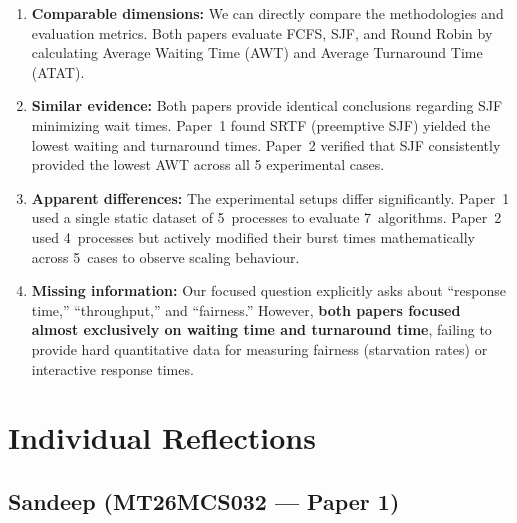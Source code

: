 \documentclass[11pt, a4paper]{article}
\begin{document}
\begin{enumerate}[nosep]
    \item \textbf{Comparable dimensions:} We can directly compare the methodologies and evaluation metrics. Both papers evaluate FCFS, SJF, and Round Robin by calculating Average Waiting Time (AWT) and Average Turnaround Time (ATAT).
    
    \item \textbf{Similar evidence:} Both papers provide identical conclusions regarding SJF minimizing wait times. Paper~1 found SRTF (preemptive SJF) yielded the lowest waiting and turnaround times. Paper~2 verified that SJF consistently provided the lowest AWT across all 5 experimental cases.
    
    \item \textbf{Apparent differences:} The experimental setups differ significantly. Paper~1 used a single static dataset of 5~processes to evaluate 7~algorithms. Paper~2 used 4~processes but actively modified their burst times mathematically across 5~cases to observe scaling behaviour.
    
    \item \textbf{Missing information:} Our focused question explicitly asks about ``response time,'' ``throughput,'' and ``fairness.'' However, \textbf{both papers focused almost exclusively on waiting time and turnaround time}, failing to provide hard quantitative data for measuring fairness (starvation rates) or interactive response times.
\end{enumerate}

\section{Individual Reflections}

\subsection{Sandeep (MT26MCS032 --- Paper 1)}
\end{document}
